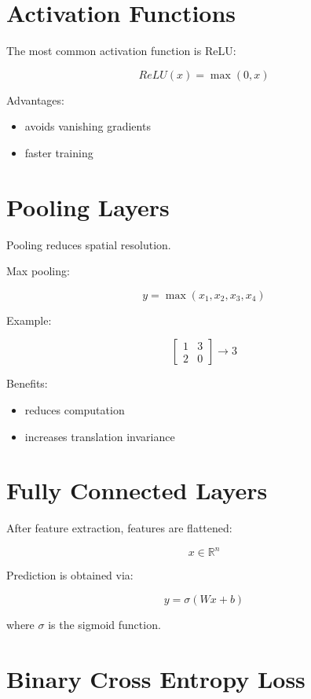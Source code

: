\documentclass[11pt]{article}
\begin{document}
\section{Activation Functions}

The most common activation function is ReLU:

\[
ReLU(x) = \max(0,x)
\]

Advantages:

\begin{itemize}
\item avoids vanishing gradients
\item faster training
\end{itemize}

\section{Pooling Layers}

Pooling reduces spatial resolution.

Max pooling:

\[
y = \max(x_1,x_2,x_3,x_4)
\]

Example:

\[
\begin{bmatrix}
1 & 3 \\
2 & 0
\end{bmatrix}
\rightarrow 3
\]

Benefits:

\begin{itemize}
\item reduces computation
\item increases translation invariance
\end{itemize}

\section{Fully Connected Layers}

After feature extraction, features are flattened:

\[
x \in \mathbb{R}^{n}
\]

Prediction is obtained via:

\[
y = \sigma(Wx + b)
\]

where $\sigma$ is the sigmoid function.

\section{Binary Cross Entropy Loss}
\end{document}
